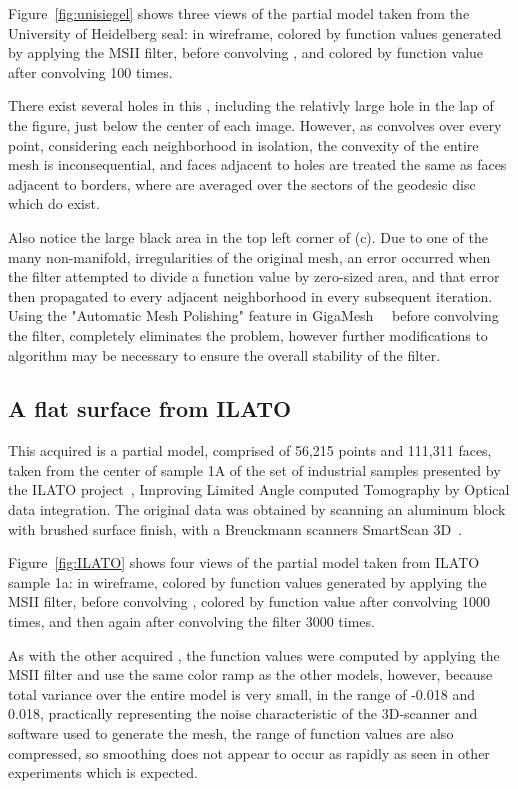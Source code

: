 Figure~\ref{fig:unisiegel} shows three views of the partial model taken from the University of Heidelberg seal: in wireframe, colored by function values generated by applying the MSII filter, before convolving , and colored by function value after convolving  100 times.

%

There exist several holes in this \tdd{}, including the relativly large hole in the lap of the figure, just below the center of each image. However, as  convolves over every point, considering each neighborhood in isolation, the convexity of the entire mesh is inconsequential, and faces adjacent to holes are treated the same as faces adjacent to borders, where  are averaged over the sectors of the geodesic disc which do exist.

Also notice the large black area in the top left corner of (c). Due to one of the many non-manifold, irregularities of the original mesh, an error occurred when the filter attempted to divide a function value by zero-sized area, and that error then propagated to every adjacent neighborhood in every subsequent iteration. Using the "Automatic Mesh Polishing" feature in GigaMesh~\cite[p.~29-32]{Mara12}~\cite[p.7]{Giga17} before convolving the filter, completely eliminates the problem, however further modifications to  algorithm may be necessary to ensure the overall stability of the filter.

%
%
%
%
\subsection{A flat surface from ILATO}
This acquired \tdd{} is a partial model, comprised of 56,215 points and 111,311 faces, taken from the center of sample 1A of the set of industrial samples presented by the ILATO project~, Improving Limited Angle computed Tomography by Optical data integration\cite{ILATO14}. The original data was obtained by scanning an aluminum block with brushed surface finish, with a Breuckmann scanners SmartScan 3D~\cite{Bayer16}.

Figure~\ref{fig:ILATO} shows four views of the partial model taken from ILATO sample 1a: in wireframe, colored by function values generated by applying the MSII filter, before convolving , colored by function value after convolving  1000 times, and then again after convolving the filter 3000 times.
%

As with the other acquired \tdd{}, the function values were computed by applying the MSII filter and use the same color ramp as the other models, however, because total variance over the entire model is very small, in the range of -0.018 and 0.018, practically representing the noise characteristic of the 3D-scanner and software used to generate the mesh, the range of function values are also compressed, so smoothing does not appear to occur as rapidly as seen in other experiments which is expected.

